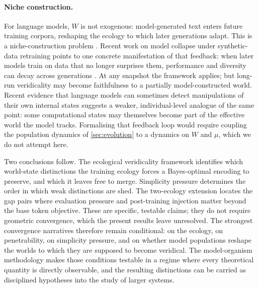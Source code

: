 \documentclass[twoside,11pt]{article}
\begin{document}
\paragraph{Niche construction.}
For language models, $W$ is not exogenous: model-generated text enters future training corpora, reshaping the ecology to which later generations adapt. This is a niche-construction problem \citep{laland_etal_2016}. Recent work on model collapse under synthetic-data retraining points to one concrete manifestation of that feedback: when later models train on data that no longer surprises them, performance and diversity can decay across generations \citep{gambetta_etal_2025_surplexity}. At any snapshot the framework applies; but long-run veridicality may become faithfulness to a partially model-constructed world. Recent evidence that language models can sometimes detect manipulations of their own internal states \citep{lindsey_2025_introspection} suggests a weaker, individual-level analogue of the same point: some computational states may themselves become part of the effective world the model tracks. Formalising that feedback loop would require coupling the population dynamics of \cref{sec:evolution} to a dynamics on $W$ and $\mu$, which we do not attempt here.

\medskip
Two conclusions follow. The ecological veridicality framework identifies which world-state distinctions the training ecology forces a Bayes-optimal encoding to preserve, and which it leaves free to merge. Simplicity pressure determines the order in which weak distinctions are shed. The two-ecology extension locates the gap pairs where evaluation pressure and post-training injection matter beyond the base token objective. These are specific, testable claims; they do not require geometric convergence, which the present results leave unresolved. The strongest convergence narratives therefore remain conditional: on the ecology, on penetrability, on simplicity pressure, and on whether model populations reshape the worlds to which they are supposed to become veridical. The model-organism methodology makes those conditions testable in a regime where every theoretical quantity is directly observable, and the resulting distinctions can be carried as disciplined hypotheses into the study of larger systems.

\end{document}
